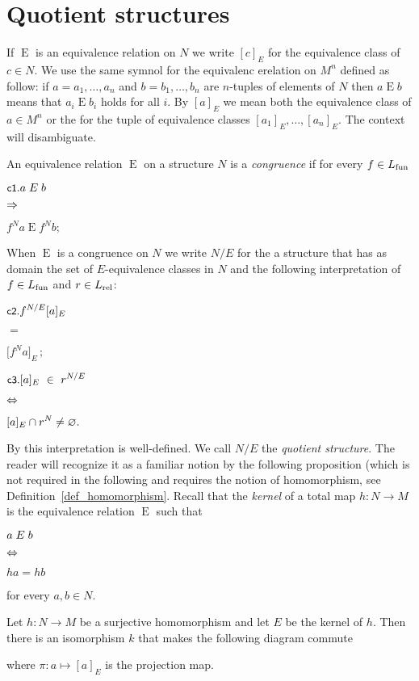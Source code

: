 \documentclass[creche.tex]{subfiles}
\begin{document}
\section{Quotient structures}\label{quotient}
\def\ceq#1#2#3{\parbox[b]{20ex}{$\displaystyle #1$}\parbox[b]{6ex}{\hfil$#2$}$\displaystyle #3$}


If $\mathrel{E}$ is an equivalence relation on $N$ we write \emph{$[c]_E$\/} for the equivalence class of $c\in N$. We use the same symnol for the equivalenc erelation on $M^n$ defined as follow: if $a=a_1,\dots,a_n$ and $b=b_1,\dots,b_n$ are $n$-tuples of elements of $N$ then \emph{$a\mathrel{E} b$\/} means that  $a_i\mathrel{E} b_i$ holds for all $i$. By \emph{$[a]_E$\/} we mean both the equivalence class of $a\in M^n$ or the for the tuple of equivalence classes $[a_1]_E,\dots,[a_n]_E$. The context will disambiguate.

An equivalence relation $\mathrel{E}$ on a structure $N$ is a \emph{congruence\/} if for every $f\in L_{\rm fun}$

\ceq{\ssf{c1}.\hfill a\mathrel{E} b}{\IMP}{f^N a\mathrel{E} f^N b;}

When $\mathrel{E}$ is a congruence on $N$ we write \emph{$N/E$\/} for the a structure that has as domain the set of $E$-equivalence classes in $N$ and the following interpretation of $f\in L_{\rm fun}$ and $r\in L_{\rm rel}$:

\ceq{\ssf{c2.}\hfill f^{N/E}[a]_E}{=}{\big[f^N a\big]_E\,;}

\ceq{\ssf{c3.}\hfill [a]_E\ \in\ r^{N/E}}{\IFF}{[a]_E\cap r^{N}\neq\0.}

By  this interpretation is well-defined. We call $N/E$ the \emph{quotient structure}. The reader will recognize it as a familiar notion by the following proposition (which is not required in the following and requires the notion of homomorphism, see Definition~\ref{def_homomorphism}. Recall that the \emph{kernel\/} of a total map $h:N\to M$ is the equivalence relation $\mathrel{E}$ such that

\ceq{\hfill a\mathrel{E} b}{\IFF}{ha=hb} 

for every $a,b\in N$.

\begin{proposition}
Let $h:N\to M$ be a surjective homomorphism and let $E$ be the kernel of $h$. Then there is an isomorphism $k$ that makes the following diagram commute


\hspace*{25ex}

where $\pi:a\mapsto [a]_E$ is the projection map.\QED
\end{proposition}
\end{document}
